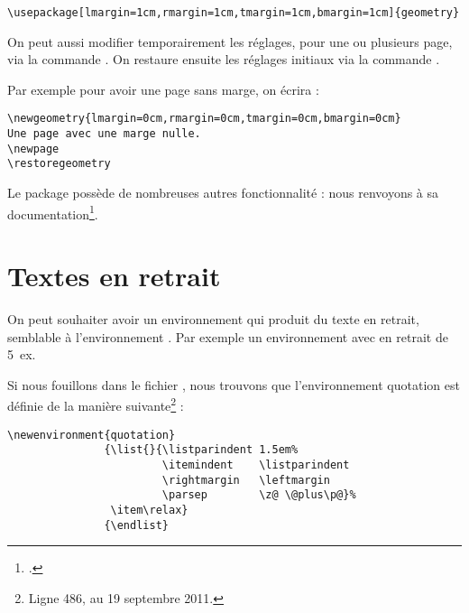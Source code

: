 \begin{verbatim}
\usepackage[lmargin=1cm,rmargin=1cm,tmargin=1cm,bmargin=1cm]{geometry}
\end{verbatim}

On peut aussi modifier temporairement les réglages, pour une ou plusieurs page, via la commande . On restaure ensuite les réglages initiaux  via la commande .

Par exemple pour avoir une page sans marge, on écrira :

\begin{verbatim}
\newgeometry{lmargin=0cm,rmargin=0cm,tmargin=0cm,bmargin=0cm}
Une page avec une marge nulle.
\newpage
\restoregeometry

\end{verbatim}

Le package  possède de nombreuses autres fonctionnalité : nous renvoyons à sa documentation\footcite{geometry}.

\section{Textes en retrait}

On peut souhaiter avoir un environnement qui produit du texte en retrait, semblable à l'environnement . Par exemple un environnement  avec en retrait de 5~ex.

Si nous fouillons dans le fichier , nous trouvons que l'environnement quotation est définie de la manière suivante\footnote{Ligne 486, au 19 septembre 2011.} :

\begin{verbatim}
\newenvironment{quotation}
               {\list{}{\listparindent 1.5em%
                        \itemindent    \listparindent
                        \rightmargin   \leftmargin
                        \parsep        \z@ \@plus\p@}%
                \item\relax}
               {\endlist}
\end{verbatim}

